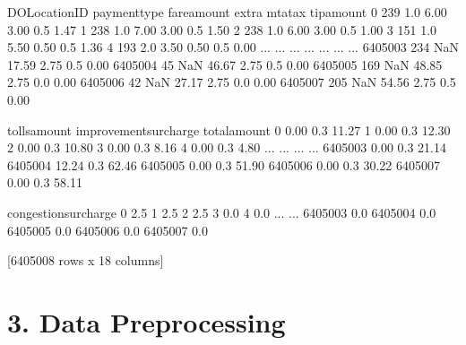 \documentclass[letterpaper,10pt,english]{jupyterBook}
\begin{document}
\begin{sphinxVerbatim}[commandchars=\\\{\}]
         DOLocationID  payment\PYGZus{}type  fare\PYGZus{}amount  extra  mta\PYGZus{}tax  tip\PYGZus{}amount  \PYGZbs{}
0                 239           1.0         6.00   3.00      0.5        1.47   
1                 238           1.0         7.00   3.00      0.5        1.50   
2                 238           1.0         6.00   3.00      0.5        1.00   
3                 151           1.0         5.50   0.50      0.5        1.36   
4                 193           2.0         3.50   0.50      0.5        0.00   
...               ...           ...          ...    ...      ...         ...   
6405003           234           NaN        17.59   2.75      0.5        0.00   
6405004            45           NaN        46.67   2.75      0.5        0.00   
6405005           169           NaN        48.85   2.75      0.0        0.00   
6405006            42           NaN        27.17   2.75      0.0        0.00   
6405007           205           NaN        54.56   2.75      0.5        0.00   

         tolls\PYGZus{}amount  improvement\PYGZus{}surcharge  total\PYGZus{}amount  \PYGZbs{}
0                0.00                    0.3         11.27   
1                0.00                    0.3         12.30   
2                0.00                    0.3         10.80   
3                0.00                    0.3          8.16   
4                0.00                    0.3          4.80   
...               ...                    ...           ...   
6405003          0.00                    0.3         21.14   
6405004         12.24                    0.3         62.46   
6405005          0.00                    0.3         51.90   
6405006          0.00                    0.3         30.22   
6405007          0.00                    0.3         58.11   

         congestion\PYGZus{}surcharge  
0                         2.5  
1                         2.5  
2                         2.5  
3                         0.0  
4                         0.0  
...                       ...  
6405003                   0.0  
6405004                   0.0  
6405005                   0.0  
6405006                   0.0  
6405007                   0.0  

[6405008 rows x 18 columns]
\end{sphinxVerbatim}


\part{3. Data Preprocessing}
\end{document}
